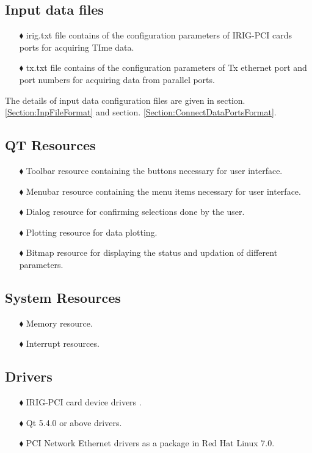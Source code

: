 \subsection{Input data files}
\begin{enumerate}
	
	\item [$\blacklozenge$] irig.txt file contains of the configuration parameters of IRIG-PCI cards ports for acquiring TIme data.
	\item [$\blacklozenge$] tx.txt file contains of the configuration parameters of Tx ethernet port and port numbers for acquiring data from parallel ports.
\end{enumerate}	
The details of input data configuration files are given in section. \ref{Section:InpFileFormat} and section. \ref{Section:ConnectDataPortsFormat}.

\subsection{QT  Resources}

\begin{enumerate}
	\item [$\blacklozenge$] Toolbar resource containing the buttons necessary for user interface.
	\item [$\blacklozenge$] Menubar resource containing the menu items necessary for user interface. 
	\item [$\blacklozenge$] Dialog resource for confirming selections done by the user.
	\item [$\blacklozenge$] Plotting resource for data plotting. 
	\item [$\blacklozenge$] Bitmap resource for displaying the status and updation of different parameters.
\end{enumerate}		

\subsection{System  Resources}
\begin{enumerate}
	\item [$\blacklozenge$] Memory resource.
	\item [$\blacklozenge$] Interrupt resources. 
\end{enumerate}

\subsection{Drivers}
\begin{enumerate}
	\item [$\blacklozenge$] IRIG-PCI card device drivers .
	\item [$\blacklozenge$] Qt 5.4.0 or above drivers.
	\item [$\blacklozenge$] PCI Network Ethernet drivers as a package in Red Hat Linux 7.0.
\end{enumerate}
